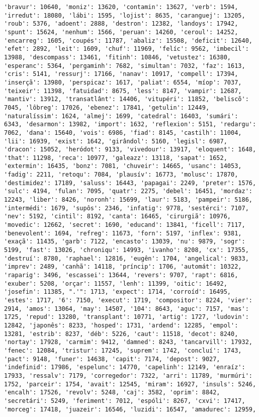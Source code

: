 \documentclass[11pt]{article}
\begin{document}
\begin{Verbatim}[commandchars=\\\{\}]
'bravur': 10640, 'moniz': 13620, 'contamin': 13627, 'verb': 1594, 'irredut': 18080, 'lábi': 1595, 'lojist': 8635, 'caranguej': 13205, 'roub': 5376, 'adoent': 2888, 'destron': 12382, 'landoys': 17942, 'spunt': 15624, 'nenhum': 1566, 'peruan': 14260, 'ceroul': 14252, 'encarreg': 1605, 'coupés': 11787, 'abaliz': 15508, 'deficit': 12640, 'efet': 2892, 'leit': 1609, 'chuf': 11969, 'felíc': 9562, 'imbecil': 13988, 'descompass': 13461, 'fitinh': 10846, 'vetustez': 16380, 'esperanc': 5364, 'pergaminh': 7682, 'simultan': 7032, 'faz': 1613, 'cris': 5141, 'ressurj': 17166, 'nanav': 10917, 'compell': 17394, 'inserçã': 13980, 'perspicaz': 1617, 'paliat': 6554, 'míop': 7037, 'teixeir': 11398, 'fatuidad': 8675, 'less': 8147, 'vampir': 12687, 'mantiv': 13912, 'transatlânt': 14406, 'vitupéri': 11852, 'beliscõ': 7045, 'lôbreg': 17026, 'ebenez': 17841, 'getulin': 12449, 'naturalíssim': 1624, 'almej': 1699, 'catedral': 16403, 'sumári': 6343, 'desarmon': 13982, 'import': 1632, 'reflexion': 5151, 'redargu': 7062, 'dana': 15640, 'vois': 6986, 'fiad': 8145, 'castilh': 11004, 'lii': 16939, 'exist': 1642, 'girândol': 5160, 'legisl': 6987, 'dracon': 15052, 'heródot': 9133, 'vivedour': 13917, 'eloquent': 1648, 'that': 11298, 'reca': 10977, 'galeazz': 13118, 'sapat': 1652, 'extermin': 16435, 'bonz': 7081, 'chuveir': 14665, 'usanc': 14053, 'fadig': 2211, 'retoqu': 7084, 'plausív': 16773, 'molusc': 17870, 'destimidez': 17189, 'saluss': 16443, 'papagai': 2249, 'preter': 1576, 'sulc': 4194, 'fulan': 7095, 'quatr': 2275, 'debel': 16451, 'mordaz': 12243, 'liber': 8426, 'noronh': 15699, 'laur': 5183, 'pampeir': 5186, 'intermédi': 1679, 'supôs': 2346, 'infatig': 9778, 'sestérci': 7107, 'nev': 5192, 'cintil': 8192, 'canta': 16465, 'cirurgiã': 10976, 'movedic': 12662, 'secret': 1690, 'educand': 13841, 'ficell': 7117, 'benevolent': 1694, 'refreg': 11673, 'forn': 5197, 'inflex': 9381, 'exaçã': 11435, 'garb': 7122, 'encasto': 13039, 'nu': 9879, 'sogr': 5199, 'fast': 13026, 'chroniqu': 14993, 'ivanho': 8208, 'cx': 17355, 'destruí': 8780, 'raphael': 12816, 'eugên': 1704, 'angelical': 9833, 'imprev': 2489, 'canhã': 14118, 'príncip': 1706, 'automát': 10322, 'raparig': 3496, 'escassei': 13644, 'revers': 9707, 'rapt': 6816, 'exuber': 5208, 'orçar': 11557, 'lenh': 11399, 'oitic': 16492, 'josefin': 11385, ".'": 1713, 'expect': 1714, 'corroíd': 16495, 'estes': 1717, '6': 7150, 'execut': 1719, 'compositor': 8224, 'vier': 2914, 'amos': 13064, 'may': 14507, '104': 8643, 'aguc': 7157, 'mas': 1725, 'repud': 13280, 'transplant': 10771, 'artig': 1727, 'ludovin': 12842, 'japonês': 8233, 'hosped': 1731, 'ardend': 12285, 'empol': 13281, 'estrib': 8237, 'déb': 5226, 'caut': 11518, 'decot': 8240, 'nortay': 17928, 'carmim': 9412, 'damned': 8243, 'tancarvill': 17932, 'fenec': 12084, 'tristur': 17245, 'suprem': 1742, 'concluí': 1743, 'pact': 9148, 'funer': 14638, 'capit': 7174, 'depost': 9027, 'indefinid': 17986, 'espelunc': 14770, 'capelinh': 12149, 'enraíz': 17933, 'ressalv': 7179, 'corregedor': 7322, 'arri': 11789, 'murmúri': 1752, 'parceir': 1754, 'avait': 12545, 'miram': 16927, 'insuls': 5246, 'encalh': 17526, 'revolv': 5248, 'caj': 3582, 'oprim': 8842, 'secretári': 5249, 'feriment': 7012, 'espóli': 8267, 'cxvi': 17417, 'morceg': 17418, 'juazeir': 16546, 'luzidi': 16547, 'amadurec': 12959, 
\end{Verbatim}
\end{document}
